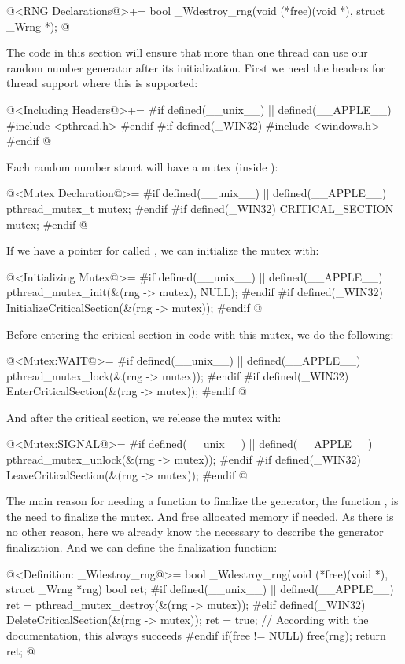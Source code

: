 \iniciocodigo
@<RNG Declarations@>+=
bool _Wdestroy_rng(void (*free)(void *), struct _Wrng *);
@
\fimcodigo


The code in this section will ensure that more than one thread can use
our random number generator after its initialization. First we need
the headers for thread support where this is supported:

\iniciocodigo
@<Including Headers@>+=
#if defined(__unix__) || defined(__APPLE__)
#include <pthread.h>
#endif
#if defined(_WIN32)
#include <windows.h>
#endif
@
\fimcodigo

Each random number struct will have a mutex
(inside ):


\iniciocodigo
@<Mutex Declaration@>=
#if defined(__unix__) || defined(__APPLE__)
pthread_mutex_t mutex;
#endif
#if defined(_WIN32)
CRITICAL_SECTION mutex;
#endif
@
\fimcodigo

If we have a pointer for 
 called , we can initialize the mutex with:

\iniciocodigo
@<Initializing Mutex@>=
#if defined(__unix__) || defined(__APPLE__)
pthread_mutex_init(&(rng -> mutex), NULL);
#endif
#if defined(_WIN32)
InitializeCriticalSection(&(rng -> mutex));
#endif
@
\fimcodigo

Before entering the critical section in code with this mutex, we do
the following:

\iniciocodigo
@<Mutex:WAIT@>=
#if defined(__unix__) || defined(__APPLE__)
pthread_mutex_lock(&(rng -> mutex));
#endif
#if defined(_WIN32)
EnterCriticalSection(&(rng -> mutex));
#endif
@
\fimcodigo

And after the critical section, we release the mutex with:

\iniciocodigo
@<Mutex:SIGNAL@>=
#if defined(__unix__) || defined(__APPLE__)
pthread_mutex_unlock(&(rng -> mutex));
#endif
#if defined(_WIN32)
LeaveCriticalSection(&(rng -> mutex));
#endif
@
\fimcodigo

The main reason for needing a function to finalize the generator, the
function , is the need to finalize the
mutex. And free allocated memory if needed. As there is no other
reason, here we already know the necessary to describe the generator
finalization. And we can define the finalization function:

\iniciocodigo
@<Definition: \_Wdestroy\_rng@>=
bool _Wdestroy_rng(void (*free)(void *), struct _Wrng *rng){
  bool ret;
#if defined(__unix__) || defined(__APPLE__)
  ret = pthread_mutex_destroy(&(rng -> mutex));
#elif defined(_WIN32)
  DeleteCriticalSection(&(rng -> mutex));
  ret = true; // According with the documentation, this always succeeds
#endif
  if(free != NULL)
    free(rng);
  return ret;
}
@
\fimcodigo

